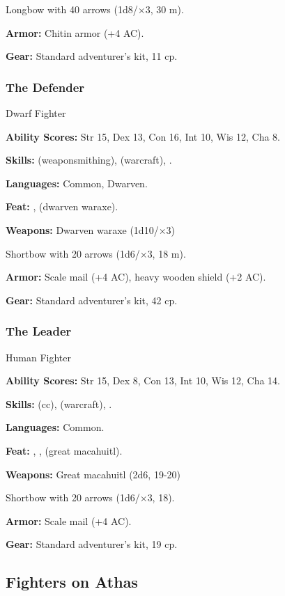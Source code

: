 Longbow with 40 arrows (1d8/$\times$3, 30 m).

\textbf{Armor:} Chitin armor (+4 AC).

\textbf{Gear:} Standard adventurer's kit, 11 cp.

\vskip3cm
\subsubsection{The Defender}
Dwarf Fighter

\textbf{Ability Scores:} Str 15, Dex 13, Con 16, Int 10, Wis 12, Cha 8.

\textbf{Skills:}  (weaponsmithing),  (warcraft), .

\textbf{Languages:} Common, Dwarven.

\textbf{Feat:} ,  (dwarven waraxe).

\textbf{Weapons:} Dwarven waraxe (1d10/$\times$3)

Shortbow with 20 arrows (1d6/$\times$3, 18 m).

\textbf{Armor:} Scale mail (+4 AC), heavy wooden shield (+2 AC).

\textbf{Gear:} Standard adventurer's kit, 42 cp.

\subsubsection{The Leader}
Human Fighter

\textbf{Ability Scores:} Str 15, Dex 8, Con 13, Int 10, Wis 12, Cha 14.

\textbf{Skills:}  (cc),  (warcraft), .

\textbf{Languages:} Common.

\textbf{Feat:} , ,  (great macahuitl).

\textbf{Weapons:} Great macahuitl (2d6, 19-20)

Shortbow with 20 arrows (1d6/$\times$3, 18).

\textbf{Armor:} Scale mail (+4 AC).

\textbf{Gear:} Standard adventurer's kit, 19 cp.


\subsection{Fighters on Athas}

